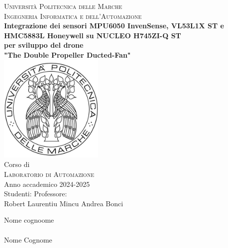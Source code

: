 \documentclass[11pt]{report}
\begin{document}


\begin{titlepage}
\begin{center}
\LARGE {\scshape{Università Politecnica delle Marche}}\\[0.5cm]
\LARGE {\scshape{Ingegneria Informatica e dell'Automazione}}\\[0.7cm]
\linespread{1}
\huge {\bfseries Integrazione dei sensori MPU6050 InvenSense, VL53L1X ST e HMC5883L Honeywell su NUCLEO H745ZI-Q ST}\\
\huge {\bfseries per sviluppo del drone}\\
\vspace{0.3cm}
\huge {\bfseries "The Double Propeller Ducted-Fan"}\\[1cm]
\linespread{1}
\includegraphics[width=5cm]{images/logoUnivpm.jpg}\\[0.5cm]
\linespread{1.2}
\Large Corso di\\
\Large {\scshape{Laboratorio di Automazione}} \\[0.3cm]
\Large {Anno accademico 2024-2025 \\[0.8cm]}
{\Large Studenti:}
\hfill {\Large Professore:}\\
{\Large Robert Laurentiu Mincu}
\hfill
{\Large Andrea Bonci}\\
\raggedright{\Large Nome cognoome\\}
\\
{\Large Nome Cognome\\[1cm]}
\end{center}
\end{titlepage}
\end{document}
